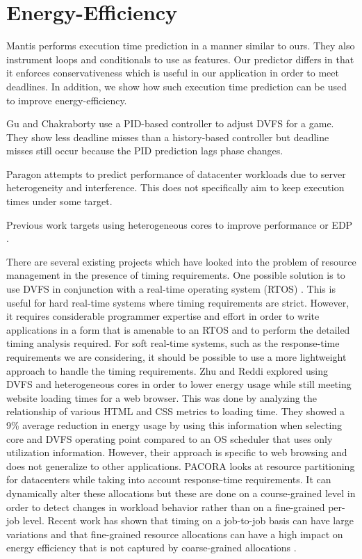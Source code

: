 \section{Energy-Efficiency}
\label{sec:related_work.energy}

Mantis \cite{mantis-atc13} performs execution time prediction in a manner
similar to ours. They also instrument loops and conditionals to use as
features. Our predictor differs in that it enforces conservativeness which is
useful in our application in order to meet deadlines. In addition, we show how
such execution time prediction can be used to improve energy-efficiency.

Gu and Chakraborty \cite{gu-dac08} use a PID-based controller to adjust DVFS
for a game. They show less deadline misses than a history-based controller but
deadline misses still occur because the PID prediction lags phase changes.

Paragon \cite{paragon-asplos13} attempts to predict performance of datacenter
workloads due to server heterogeneity and interference. This does not
specifically aim to keep execution times under some target.

Previous work targets using heterogeneous cores to improve performance
\cite{paragon-asplos13, pie-isca12, heteroscouts-sigmetrics11} or EDP \cite{chen-dac09}.

There are several existing projects which have looked into the problem of
resource management in the presence of timing requirements. One possible
solution is to use DVFS in conjunction with a real-time operating system (RTOS)
\cite{rtdvfs-systor12}. This is useful for hard real-time systems where timing
requirements are strict. However, it requires considerable programmer expertise
and effort in order to write applications in a form that is amenable to an RTOS
and to perform the detailed timing analysis required. For soft real-time
systems, such as the response-time requirements we are considering, it should
be possible to use a more lightweight approach to handle the timing
requirements. Zhu and Reddi \cite{zhu-hpca13} explored using DVFS and
heterogeneous cores in order to lower energy usage while still meeting website
loading times for a web browser. This was done by analyzing the relationship of
various HTML and CSS metrics to loading time. They showed a 9\% average
reduction in energy usage by using this information when selecting core and
DVFS operating point compared to an OS scheduler that uses only utilization
information.  However, their approach is specific to web browsing and does not
generalize to other applications. PACORA \cite{pacora-hotpar11} looks at
resource partitioning for datacenters while taking into account response-time
requirements. It can dynamically alter these allocations but these are done on
a course-grained level in order to detect changes in workload behavior rather
than on a fine-grained per-job level. Recent work has shown that timing on a
job-to-job basis can have large variations \cite{atlas-rtas13} and that
fine-grained resource allocations can have a high impact on energy efficiency
that is not captured by coarse-grained allocations \cite{padmanabha-micro13}.


